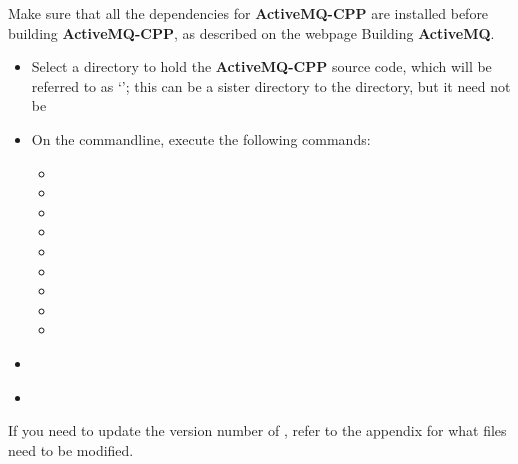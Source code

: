 Make sure that all the dependencies for \textbf{ActiveMQ-CPP} are installed before
building \textbf{ActiveMQ-CPP}, as described on the web\longDash{}page
%
{Building \textbf{ActiveMQ}}.
\begin{itemize}
\item Select a directory to hold the \textbf{ActiveMQ-CPP} source code, which will be
referred to as `'; this can be a sister directory to the
 directory, but it need not be
\item\exSp{}On the command\longDash{}line, execute the following commands:
\begin{itemize}
\item{}
\item\exSp{}
\item\exSp{}
\item\exSp{}
\item\exSp{}
\item\exSp{}
\item\exSp{}
\item\exSp{}
\item\exSp{}
\end{itemize}
\end{itemize}
\tertiaryEnd
{}
\begin{itemize}
\item\TBD
\end{itemize}
\tertiaryEnd
{}
\begin{itemize}
\item\TBD
\end{itemize}
\tertiaryEnd
{}
If you need to update the version number of \mplusm, refer to the
 appendix for what files
need to be modified.
